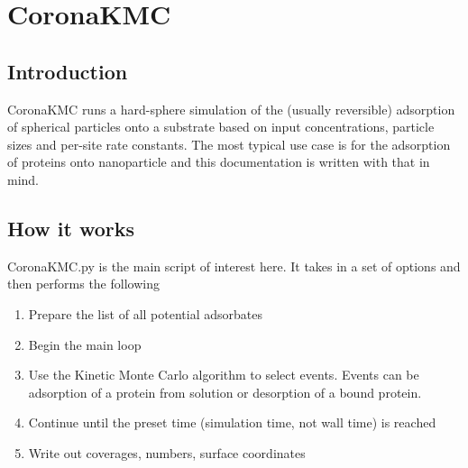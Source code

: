 \documentclass[10pt,a4paper,onecolumn]{report}
\begin{document}
\chapter{CoronaKMC}
 \section{Introduction}
 CoronaKMC runs a hard-sphere simulation of the (usually reversible) adsorption of spherical particles onto a substrate based on input concentrations, particle sizes and per-site rate constants. The most typical use case is for the adsorption of proteins onto nanoparticle and this documentation is written with that in mind. 
 
 \section{How it works}
CoronaKMC.py is the main script of interest here. It takes in a set of options and then performs the following
\begin{enumerate}
\item Prepare the list of all potential adsorbates
\item Begin the main loop
\item Use the Kinetic Monte Carlo algorithm to select events. Events can be adsorption of a protein from solution or desorption of a bound protein.
\item Continue until the preset time (simulation time, not wall time) is reached
\item Write out coverages, numbers, surface coordinates
\end{enumerate} 
 
\end{document}
